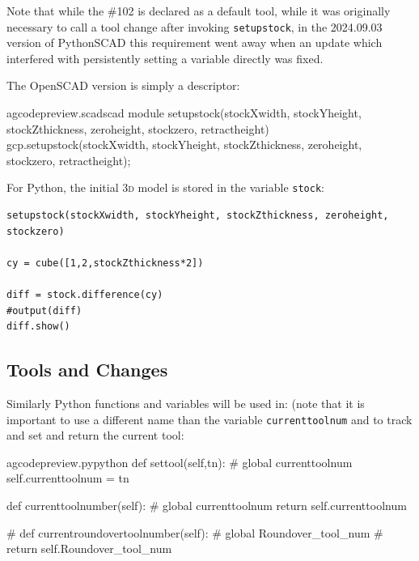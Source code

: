 \documentclass{ltxdoc}
\begin{document}
Note that while the \#102 is declared as a default tool, while it was originally necessary to call a tool change after invoking \verb|setupstock|, in the 2024.09.03 version of PythonSCAD this requirement went away when an update which interfered with persistently setting a variable directly was fixed.

The OpenSCAD version is simply a descriptor:

\lstset{firstnumber=\thegcpscad}
\begin{writecode}{a}{gcodepreview.scad}{scad}
module setupstock(stockXwidth, stockYheight, stockZthickness, zeroheight, stockzero, retractheight) {
    gcp.setupstock(stockXwidth, stockYheight, stockZthickness, zeroheight, stockzero, retractheight);
}

\end{writecode}
\addtocounter{gcpscad}{4}

For Python, the initial \textsc{3d} model is stored in the variable \verb|stock|:

\begin{verbatim}
setupstock(stockXwidth, stockYheight, stockZthickness, zeroheight, stockzero)

cy = cube([1,2,stockZthickness*2])

diff = stock.difference(cy)
#output(diff)
diff.show()
\end{verbatim}

\subsection{Tools and Changes}
 
Similarly Python functions and variables will be used in:  (note that it is important to use a different name than the variable \verb|currenttoolnum| and  to track and set and return the current tool:

 
\lstset{firstnumber=\thegcpy}
\begin{writecode}{a}{gcodepreview.py}{python}
    def settool(self,tn):
#        global currenttoolnum
        self.currenttoolnum = tn

    def currenttoolnumber(self):
#        global currenttoolnum
        return self.currenttoolnum

#    def currentroundovertoolnumber(self):
#        global Roundover_tool_num
#        return self.Roundover_tool_num

\end{writecode}
\addtocounter{gcpy}{12}
\end{document}
